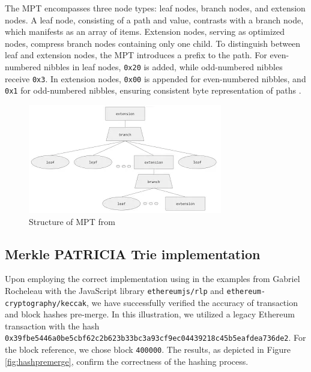 \documentclass[fleqn,10pt]{olplainarticle}
\begin{document}
The MPT encompasses three node types: leaf nodes, branch nodes, and extension nodes. A leaf node, consisting of a path and value, contrasts with a branch node, which manifests as an array of items. Extension nodes, serving as optimized nodes, compress branch nodes containing only one child. To distinguish between leaf and extension nodes, the MPT introduces a prefix to the path. For even-numbered nibbles in leaf nodes, \texttt{0x20} is added, while odd-numbered nibbles receive \texttt{0x3}. In extension nodes, \texttt{0x00} is appended for even-numbered nibbles, and \texttt{0x1} for odd-numbered nibbles, ensuring consistent byte representation of paths \cite{kim_Ethereum_MPT_2018}.

\begin{figure}[h]
	\centering
	\includegraphics[width=0.7\linewidth]{img/MPT_E2}
	\caption{Structure of MPT from  \cite{kim_Ethereum_MPT_2018}}
	\label{fig:mpte2}
\end{figure}

\subsection{Merkle PATRICIA Trie implementation}

Upon employing the correct implementation using in the examples from Gabriel Rocheleau \cite{rocheleau_ethereums_2022} with the JavaScript library \texttt{ethereumjs/rlp} and \texttt{ethereum-cryptography/keccak}, we have successfully verified the accuracy of transaction and block hashes pre-merge. In this illustration, we utilized a legacy Ethereum transaction with the hash \\ \texttt{0x39fbe5446a0be5cbf62c2b623b33bc3a93cf9ec04439218c45b5eafdea736de2}. For the block reference, we chose block \texttt{400000}. The results, as depicted in Figure \ref{fig:hashpremerge}, confirm the correctness of the hashing process.
\end{document}
